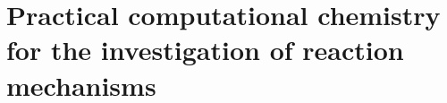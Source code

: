 \chapter{Practical computational chemistry for the investigation of reaction
mechanisms}%
\label{ch:tutorial}

\lipsum[1]
